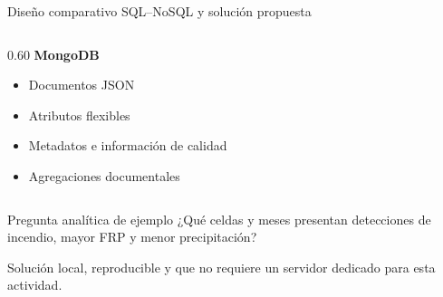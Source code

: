 \documentclass[10pt,aspectratio=169]{beamer}
\begin{document}
\begin{frame}{Diseño comparativo SQL--NoSQL y solución propuesta}
\begin{columns}[T,onlytextwidth]
\begin{column}{0.60\textwidth}
\vspace{0.2cm}
\textbf{MongoDB}
\begin{itemize}
\setlength\itemsep{0pt}
\item Documentos JSON
\item Atributos flexibles
\item Metadatos e información de calidad
\item Agregaciones documentales
\end{itemize}
\end{column}

\end{columns}

\vspace{0.1cm}
\begin{block}{\scriptsize Pregunta analítica de ejemplo}
\scriptsize ¿Qué celdas y meses presentan detecciones de incendio, mayor FRP y menor precipitación?
\end{block}

\vspace{-0.1cm}
\scriptsize
Solución local, reproducible y que no requiere un servidor dedicado para esta actividad.

\end{frame}
\end{document}
